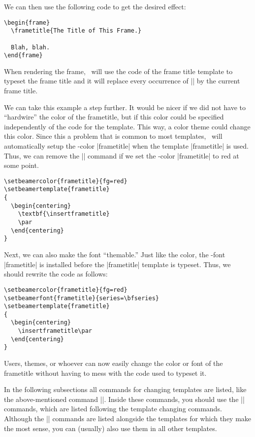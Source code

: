 We can then use the following code to get the desired effect:
\begin{verbatim}
\begin{frame}
  \frametitle{The Title of This Frame.}

  Blah, blah.
\end{frame}
\end{verbatim}
When rendering the frame, \beamer\ will use the code of the
frame title template to typeset the frame title and it will replace
every occurrence of |\insertframetitle| by the current frame
title.

We can take this example a step further. It would be nicer if we did
not have to ``hardwire'' the color of the frametitle, but if this
color could be specified independently of the code for the
template. This way, a color theme could change this color. Since this
a problem that is common to most templates, \beamer\ will
automatically setup the \beamer-color |frametitle| when the template
|frametitle| is used. Thus, we can remove the |\color{red}| command if
we set the \beamer-color |frametitle| to red at some point.
\begin{verbatim}
\setbeamercolor{frametitle}{fg=red}
\setbeamertemplate{frametitle}
{
  \begin{centering}
    \textbf{\insertframetitle}
    \par
  \end{centering}
}
\end{verbatim}
Next, we can also make the font ``themable.'' Just like the color, the
\beamer-font |frametitle| is installed before the |frametitle|
template is typeset. Thus, we should rewrite the code as follows:
\begin{verbatim}
\setbeamercolor{frametitle}{fg=red}
\setbeamerfont{frametitle}{series=\bfseries}
\setbeamertemplate{frametitle}
{
  \begin{centering}
    \insertframetitle\par
  \end{centering}
}
\end{verbatim}
Users, themes, or whoever can now easily change the color or font of
the frametitle without having to mess with the code used to typeset
it.




In the following subsections all commands for changing templates are
listed, like the above-mentioned command
|\useframetitletemplate|. Inside these commands, you should use
the |\insertxxxx| commands, which are listed following the template
changing commands. Although the |\insertxxxx| commands are listed
alongside the templates for which they make the most sense, you can
(usually) also use them in all other templates.

